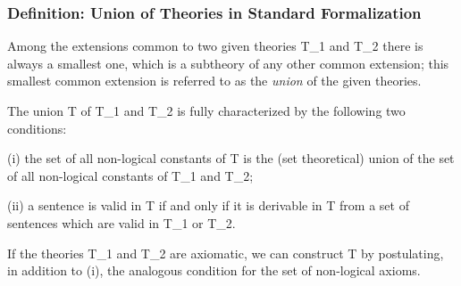 \hypertarget{definition-union-of-theories-in-standard-formalization}{%
\subsubsection{Definition: Union of Theories in Standard
Formalization}\label{definition-union-of-theories-in-standard-formalization}}

Among the extensions common to two given theories T\_1 and T\_2 there is
always a smallest one, which is a subtheory of any other common
extension; this smallest common extension is referred to as the
\emph{union} of the given theories.

The union T of T\_1 and T\_2 is fully characterized by the following two
conditions:

(i) the set of all non-logical constants of T is the (set theoretical)
union of the set of all non-logical constants of T\_1 and T\_2;

(ii) a sentence is valid in T if and only if it is derivable in T from a
set of sentences which are valid in T\_1 or T\_2.

If the theories T\_1 and T\_2 are axiomatic, we can construct T by
postulating, in addition to (i), the analogous condition for the set of
non-logical axioms.

